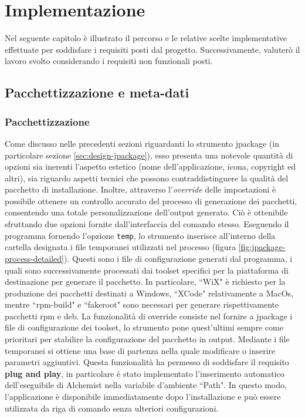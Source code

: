 

\chapter{Implementazione}

Nel seguente capitolo è illustrato il percorso e le relative scelte implementative effettuate per soddisfare i requisiti posti dal progetto. Successivamente, valuterò il lavoro svolto considerando i requisiti non funzionali posti.

\section{Pacchettizzazione e meta-dati}

\subsection{Pacchettizzazione}
Come discusso nelle precedenti sezioni riguardanti lo strumento jpackage (in particolare sezione \ref{sec:design-jpackage}), esso presenta una notevole quantità di opzioni sia inerenti l'aspetto estetico (nome dell'applicazione, icona, copyright ed altri), sia riguardo aspetti tecnici che possono contraddistinguere la qualità del pacchetto di installazione. Inoltre, attraverso l'\textit{override} delle impostazioni è possibile ottenere un controllo accurato del processo di generazione dei pacchetti, consentendo una totale personalizzazione dell'output generato. Ciò è ottenibile sfruttando due opzioni fornite dall'interfaccia del comando stesso. Eseguendo il programma fornendo l'opzione \texttt{temp}, lo strumento inserisce all'interno della cartella designata i file temporanei utilizzati nel processo (figura \ref{fig:jpackage-process-detailed}). Questi sono i file di configurazione generati dal programma, i quali sono successivamente processati dai toolset specifici per la piattaforma di destinazione per generare il pacchetto. In particolare, ``WiX" è richiesto per la produzione dei pacchetti destinati a Windows, ``XCode" relativamente a MacOs, mentre ``rpm-build" e ``fakeroot" sono necessari per generare rispettivamente pacchetti rpm e deb. La funzionalità di override consiste nel fornire a jpackage i file di configurazione dei toolset, lo strumento pone quest'ultimi sempre come prioritari per stabilire la configurazione del pacchetto in output. Mediante i file temporanei si ottiene una base di partenza nella quale modificare o inserire parametri aggiuntivi. Questa funzionalità ha permesso di soddisfare il requisito \textbf{plug and play}, in particolare è stato implementato l'inserimento automatico dell'eseguibile di Alchemist nella variabile d'ambiente ``Path". In questo modo, l'applicazione è disponibile immediatamente dopo l'installazione e può essere utilizzata da riga di comando senza ulteriori configurazioni.

